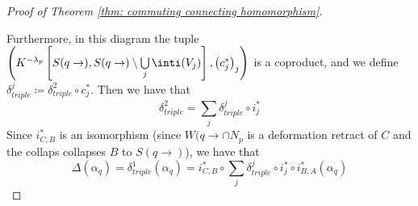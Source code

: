 \begin{proof}[Proof of Theorem \ref{thm: commuting connecting homomorphism}]
\begin{fdiagram}
\begin{tikzcd}
			\end{tikzcd} 
		\end{fdiagram}
		\noindent	Furthermore, in this diagram the tuple $\left(K^{-\lambda_p}\left[ S(q\to),S(q\to)\setminus \bigcup\limits_j \inti(V_j) \right],\left(c_j^*\right)_j\right)$ is a coproduct, and we define  $\delta^j_{triple}\coloneq \delta^2_{triple}\circ c_j^*$. Then we have that 
		\begin{equation*}
			\delta^2_ {triple}=\sum_j\delta^j_{triple}\circ i_j^*
		\end{equation*}
		Since $i_{C,B}^*$ is an isomorphism (since $W(q\to \cap N_p$ is a deformation retract of $C$ and the collaps collapses $B$ to $S(q\to)$), we have that 
		\begin{equation} \label{eq: Delta in terms of delta j}
			\Delta(\alpha_q)=\delta^1_{triple}(\alpha_q)=i^*_{C,B}\circ \sum_j\delta^j_{triple}\circ i_j^* \circ i^*_{B,A}(\alpha_q)
		\end{equation}
		

\end{proof}
